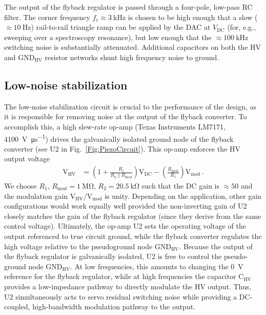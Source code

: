 \documentclass[aip,rsi,preprint,graphicx]{revtex4-1} %
\begin{document}
The output of the flyback regulator is passed through a four-pole, low-pass RC filter.
The corner frequency $f_c \approx \SI{3}{\kilo\hertz}$ is chosen to be high enough that a slow ($\approx \SI{10}{\hertz}$) rail-to-rail triangle ramp can be applied by the DAC at $V_\text{DC}$ (for, e.g., sweeping over a spectroscopy resonance), but low enough that the $\approx \SI{100}{\kilo\hertz}$ switching noise is substantially attenuated.
Additional capacitors on both the HV and $\text{GND}_{\text{HV}}$ resistor networks shunt high frequency noise to ground.


\subsection{Low-noise stabilization}
\label{Sec:LowNoiseStabilization}

The low-noise stabilization circuit is crucial to the performance of the design, as it is responsible for removing noise at the output of the flyback converter.
To accomplish this, a high slew-rate op-amp (Texas Instruments LM7171, \SI[per-mode=symbol]{4100}{\volt\per\micro\second}) drives the galvanically isolated ground node of the flyback converter (see U2 in Fig.~\ref{Fig:PiezoCircuit}).
This op-amp enforces the HV output voltage
\begin{align}
\text{V}_\text{HV} &= \left(1 + \frac{R_1}{R_2~||~R_\text{mod}}\right) \text{V}_\text{DC} -
\left(\frac{R_\text{mod}}{R_1}\right) \text{V}_\text{mod}\,.
\label{Eq:FullTransferFunc}
\end{align}
We choose $R_1,\,R_\text{mod} = \SI{1}{\mega\ohm}$, $R_2 = \SI{20.5}{\kilo\ohm}$ such that the DC gain is $\approx 50$ and the modulation gain $\text{V}_\text{HV}/\text{V}_\text{mod}$ is unity.
Depending on the application, other gain configurations would work equally well provided the non-inverting gain of U2 closely matches the gain of the flyback regulator (since they derive from the same control voltage).
Ultimately, the op-amp U2 sets the operating voltage of the output referenced to true circuit ground, while the flyback converter regulates the high voltage relative to the pseudoground node $\text{GND}_\text{HV}$.
Because the output of the flyback regulator is galvanically isolated, U2 is free to control the pseudo-ground node $\text{GND}_\text{HV}$. 
At low frequencies, this amounts to changing the \SI{0}{\volt} reference for the flyback regulator, while at high frequencies the capacitor $\text{C}_\text{HV}$ provides a low-impedance pathway to directly modulate the HV output.
Thus, U2 simultaneously acts to servo residual switching noise while providing a DC-coupled, high-bandwidth modulation pathway to the output.
\end{document}
